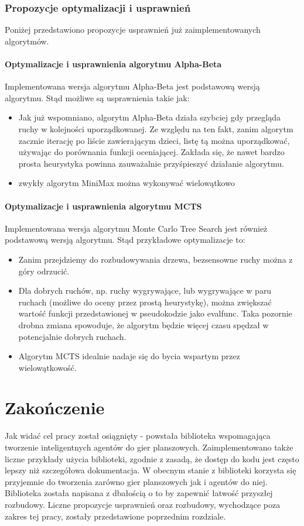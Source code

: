 \documentclass[polish,shortabstract,inz]{iithesis}
\begin{document}
\subsection{Propozycje optymalizacji i usprawnień}
Poniżej przedstawiono propozycje usprawnień już zaimplementowanych algorytmów.

\subsubsection{Optymalizacje i usprawnienia algorytmu Alpha-Beta}
Implementowana wersja algorytmu Alpha-Beta jest podstawową wersją algorytmu.
Stąd możliwe są usprawnienia takie jak:
\begin{itemize}
  \item Jak już wspomniano, algorytm Alpha-Beta działa szybciej gdy przegląda ruchy w kolejności uporządkowanej.
    Ze względu na ten fakt, zanim algorytm zacznie iterację po liście zawierającym dzieci, listę tą można uporządkować, używając do porównania funkcji oceniającej.
    Zakłada się, że nawet bardzo prosta heurystyka powinna zauważalnie przyśpieszyć działanie algorytmu.
  \item zwykły algorytm MiniMax można wykonywać wielowątkowo
\end{itemize}

\subsubsection{Optymalizacje i usprawnienia algorytmu MCTS}
Implementowana wersja algorytmu Monte Carlo Tree Search jest również podstawową wersją algorytmu.
Stąd przykładowe optymalizacje to:

\begin{itemize}
  \item Zanim przejdziemy do rozbudowywania drzewa, bezsensowne ruchy można z góry odrzucić.
  \item Dla dobrych ruchów, np. ruchy wygrywające, lub wygrywające w paru ruchach (możliwe do oceny przez prostą heurystykę), można zwiększać wartość funkcji przedstawionej w pseudokodzie jako eval\textunderscore func. Taka pozornie drobna zmiana spowoduje, że algorytm będzie więcej czasu spędzał w potencjalnie dobrych ruchach.
  \item Algorytm MCTS idealnie nadaje się do bycia wspartym przez wielowątkowość.
\end{itemize}

\chapter{Zakończenie}
Jak widać cel pracy został osiągnięty - powstała biblioteka wspomagająca tworzenie inteligentnych agentów do gier planszowych.
Zaimplementowano także liczne przykłady użycia biblioteki, zgodnie z zasadą, że dostęp do kodu jest często lepszy niż szczegółowa dokumentacja.
W obecnym stanie z biblioteki korzysta się przyjemnie do tworzenia zarówno gier planszowych jak i agentów do niej.
Biblioteka została napisana z dbałością o to by zapewnić łatwość przyszłej rozbudowy.
Liczne propozycje usprawnień oraz rozbudowy, wychodzące poza zakres tej pracy, zostały przedstawione poprzednim rozdziale.



\end{document}
